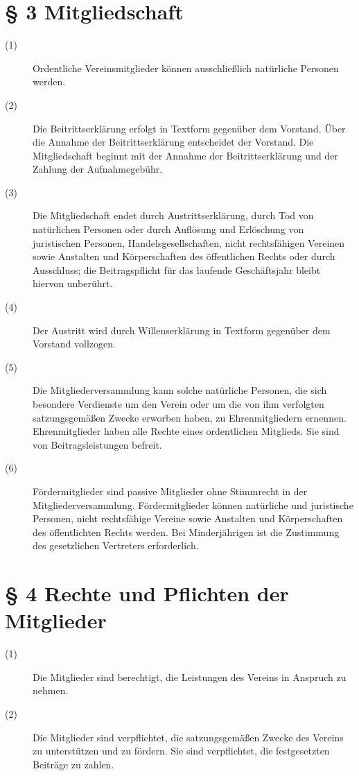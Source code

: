 \documentclass[12pt,paper=a4,ngerman]{scrreprt}
\begin{document}
\section{\S{} 3 Mitgliedschaft}
\begin{description}
	\item[(1)] Ordentliche Vereinsmitglieder können ausschließlich natürliche Personen werden.
	\item[(2)] Die Beitrittserklärung erfolgt in Textform gegenüber dem Vorstand. Über die Annahme der Beitrittserklärung entscheidet der Vorstand. Die Mitgliedschaft beginnt mit der Annahme der Beitrittserklärung und der Zahlung der Aufnahmegebühr.
	\item[(3)] Die Mitgliedschaft endet durch Austrittserklärung, durch Tod von natürlichen Personen oder durch Auflösung und Erlöschung von juristischen Personen, Handelsgesellschaften, nicht rechtsfähigen Vereinen sowie Anstalten und Körperschaften des öffentlichen Rechts oder durch Ausschluss; die Beitragspflicht für das laufende Geschäftsjahr bleibt hiervon unberührt.
	\item[(4)] Der Austritt wird durch Willenserklärung in Textform gegenüber dem Vorstand vollzogen.
	\item[(5)] Die Mitgliederversammlung kann solche natürliche Personen, die sich besondere Verdienste um den Verein oder um die von ihm verfolgten satzungsgemäßen Zwecke erworben haben, zu Ehrenmitgliedern ernennen. Ehrenmitglieder haben alle Rechte eines ordentlichen Mitglieds. Sie sind von Beitragsleistungen befreit.
	\item[(6)] Fördermitglieder sind passive Mitglieder ohne Stimmrecht in der Mitgliederversammlung. Fördermitglieder können natürliche und juristische Personen, nicht rechtsfähige Vereine sowie Anstalten und Körperschaften des öffentlichten Rechts werden. Bei Minderjährigen ist die Zustimmung des gesetzlichen Vertreters erforderlich.
\end{description}
\section{\S{} 4 Rechte und Pflichten der Mitglieder}
\begin{description}
	\item[(1)] Die Mitglieder sind berechtigt, die Leistungen des Vereins in Anspruch zu nehmen.
	\item[(2)] Die Mitglieder sind verpflichtet, die satzungsgemäßen Zwecke des Vereins zu unterstützen und zu fördern. Sie sind verpflichtet, die festgesetzten Beiträge zu zahlen.
\end{description}
\end{document}
